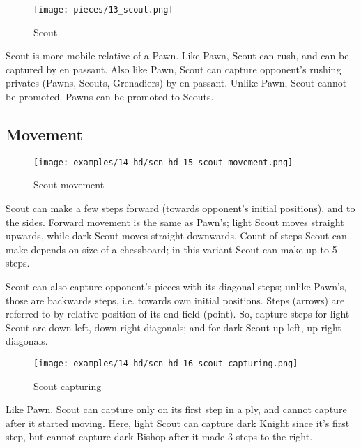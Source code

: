 \vspace*{-0.7\baselineskip}
\noindent
\begin{wrapfigure}[9]{l}{0.4\textwidth}
\centering
\texttt{[image: pieces/13\_scout.png]}
\vspace*{-1.3\baselineskip}
\caption{Scout}
\label{fig:13_scout}
\end{wrapfigure}
Scout is more mobile relative of a Pawn. Like Pawn, Scout can rush, and can be captured
by en passant. Also like Pawn, Scout can capture opponent's rushing privates (Pawns,
Scouts, Grenadiers) by en passant. Unlike Pawn, Scout cannot be promoted. Pawns can be
promoted to Scouts.

\vspace*{0.7\baselineskip}
\subsection*{Movement}
\label{sec:Hemera's Dawn/Scout/Movement}

\vspace*{-1.3\baselineskip}
\noindent
\begin{figure}[!h]
\texttt{[image: examples/14\_hd/scn\_hd\_15\_scout\_movement.png]}
\vspace*{-1.3\baselineskip}
\caption{Scout movement}
\label{fig:scn_hd_15_scout_movement}
\end{figure}

\vspace*{-0.5\baselineskip}
Scout can make a few steps forward (towards opponent's initial positions), and
to the sides. Forward movement is the same as Pawn's; light Scout moves straight
upwards, while dark Scout moves straight downwards. Count of steps Scout can make
depends on size of a chessboard; in this variant Scout can make up to 5 steps.

\clearpage %

Scout can also capture opponent's pieces with its diagonal steps; unlike Pawn's,
those are backwards steps, i.e. towards own initial positions. \newline
\indent
Steps (arrows) are referred to by relative position of its end field (point).
So, capture-steps for light Scout are down-left, down-right diagonals;
and for dark Scout up-left, up-right diagonals.

\vspace*{-0.3\baselineskip}
\noindent
\begin{wrapfigure}[7]{l}{0.41\textwidth}
\centering
\texttt{[image: examples/14\_hd/scn\_hd\_16\_scout\_capturing.png]}
\vspace*{-0.3\baselineskip}
\caption{Scout capturing}
\label{fig:scn_hd_16_scout_capturing}
\end{wrapfigure}
Like Pawn, Scout can capture only on its first step in a ply, and cannot capture
after it started moving. Here, light Scout can capture dark Knight since it's
first step, but cannot capture dark Bishop after it made 3 steps to the right.

